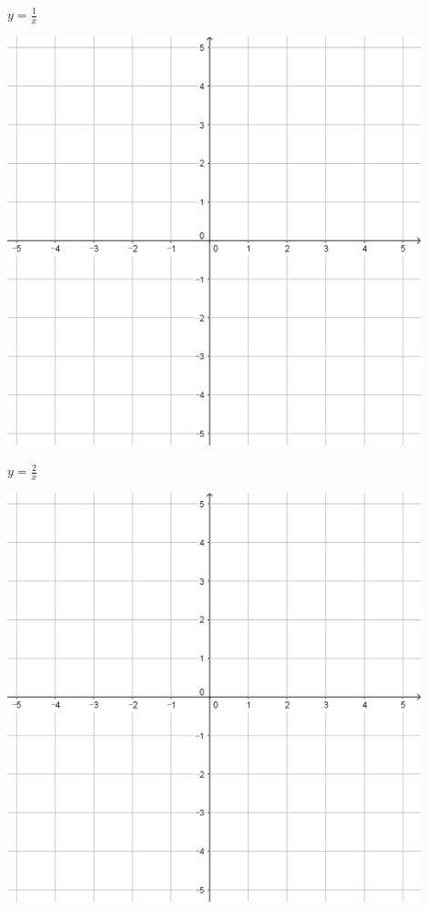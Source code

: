 \documentclass[a4paper]{oblivoir}
\begin{document}
\clearpage
\begin{minipage}{0.45\textwidth}\centering
\(y=\frac1x\)
\par\bigskip\includegraphics[width=0.9\textwidth]{55}
\end{minipage}
\begin{minipage}{0.45\textwidth}\centering
\(y=\frac2x\)
\par\bigskip\includegraphics[width=0.9\textwidth]{55}
\end{minipage}\bigskip\bigskip\par
\end{document}

